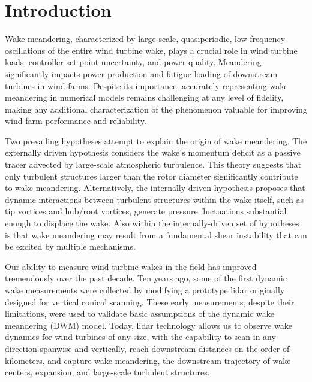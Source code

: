 \documentclass[%
 aip,
 amsmath,
 amssymb,
]{revtex4-2}
\begin{document}
\section{Introduction}
Wake meandering, characterized by large-scale, quasiperiodic, low-frequency oscillations of the entire wind turbine wake, plays a crucial role in wind turbine loads, controller set point uncertainty, and power quality. 
Meandering significantly impacts power production and fatigue loading of downstream turbines in wind farms.\cite{larsen2008wake, brugger2020lidar, wiseWakeMeanderingEffects2020a} 
Despite its importance, accurately representing wake meandering in numerical models remains challenging at any level of fidelity, making any additional characterization of the phenomenon valuable for improving wind farm performance and reliability.

Two prevailing hypotheses attempt to explain the origin of wake meandering. 
The externally driven hypothesis considers the wake's momentum deficit as a passive tracer advected by large-scale atmospheric turbulence.\cite{larsen2008wake}
This theory suggests that only turbulent structures larger than the rotor diameter significantly contribute to wake meandering.\cite{espana2012wind,baker1985wake, zambrano1983wake, larsen2007dynamic, larsen2008wake, jonkman2017development}
Alternatively, the internally driven hypothesis proposes that dynamic interactions between turbulent structures within the wake itself, such as tip vortices and hub/root vortices, generate pressure fluctuations substantial enough to displace the wake.\cite{medici2008measurements, okulov2007stability, okulov2014regular, howard2015statistics, foti2016wake, foti2018wake} 
Also within the internally-driven set of hypotheses is that wake meandering may result from a fundamental shear instability that can be excited by multiple mechanisms.\cite{andersen2013simulation,liOnsetWakeMeandering2022}

Our ability to measure wind turbine wakes in the field has improved tremendously over the past decade. 
Ten years ago, some of the first dynamic wake measurements were collected by modifying a prototype lidar originally designed for vertical conical scanning.\cite{bingol_light_2010, trujillo_light_2011}
These early measurements, despite their limitations, were used to validate basic assumptions of the dynamic wake meandering (DWM) model.\cite{larsen2007dynamic, larsen2008wake} 
Today, lidar technology allows us to observe wake dynamics for wind turbines of any size, with the capability to scan in any direction spanwise and vertically, reach downstream distances on the order of kilometers, and capture wake meandering, the downstream trajectory of wake centers, expansion, and large-scale turbulent structures.\cite{brugger2020lidar}
\end{document}
